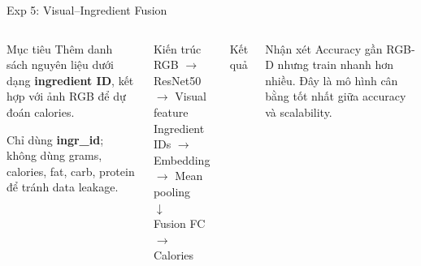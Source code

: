 \documentclass[10pt,aspectratio=169]{beamer}
\newcommand{\kw}[1]{\textcolor{uitblue}{\bfseries #1}}
\begin{document}
\begin{frame}{Exp 5: Visual--Ingredient Fusion}
\scriptsize
\begin{columns}[T]
\begin{uitbox}{Mục tiêu}
Thêm danh sách nguyên liệu dưới dạng \kw{ingredient ID}, kết hợp với ảnh RGB để dự đoán calories.

\vspace{0.08cm}
Chỉ dùng \kw{ingr\_id}; không dùng grams, calories, fat, carb, protein để tránh data leakage.
\end{uitbox}

\vspace{0.12cm}
\begin{accentbox}{Kiến trúc}
\centering
RGB $\rightarrow$ ResNet50 $\rightarrow$ Visual feature\\
Ingredient IDs $\rightarrow$ Embedding $\rightarrow$ Mean pooling\\
$\downarrow$\\
Fusion FC $\rightarrow$ Calories
\end{accentbox}

\begin{greenbox}{Kết quả}
\centering
{}
\end{greenbox}
\vspace{0.1cm}
\begin{redbox}{Nhận xét}
Accuracy gần RGB-D nhưng train nhanh hơn nhiều. Đây là mô hình cân bằng tốt nhất giữa accuracy và scalability.
\end{redbox}
\end{columns}
\end{frame}
\end{document}
